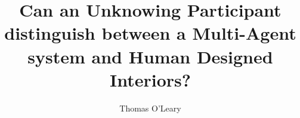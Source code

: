 \documentclass[journal]{IEEEtran}
\begin{document}
\title{Can an Unknowing Participant distinguish between a Multi-Agent system and Human Designed Interiors?}

\author{Thomas O'Leary}

\maketitle

















\end{document}
